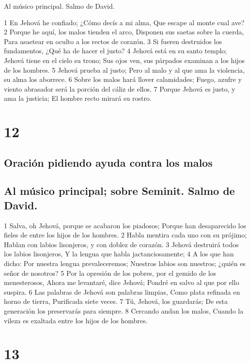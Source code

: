 Al músico principal. Salmo de David.

1 En Jehová he confiado;
¿Cómo decís a mi alma,
Que escape al monte cual ave?
2 Porque he aquí, los malos tienden el arco,
Disponen sus saetas sobre la cuerda,
Para asaetear en oculto a los rectos de corazón.
3 Si fueren destruidos los fundamentos,
¿Qué ha de hacer el justo?
4 Jehová está en su santo templo;
Jehová tiene en el cielo su trono;
Sus ojos ven, sus párpados examinan a los hijos de los hombres.
5 Jehová prueba al justo;
Pero al malo y al que ama la violencia, su alma los aborrece.
6 Sobre los malos hará llover calamidades;
Fuego, azufre y viento abrasador será la porción del cáliz de ellos.
7 Porque Jehová es justo, y ama la justicia;
El hombre recto mirará su rostro.

\chapter{12}

\section*{Oración pidiendo ayuda contra los malos}

\section*{Al músico principal; sobre Seminit. Salmo de David.}

1 Salva, oh Jehová, porque se acabaron los piadosos;
Porque han desaparecido los fieles de entre los hijos de los hombres.
2 Habla mentira cada uno con su prójimo;
Hablan con labios lisonjeros, y con doblez de corazón.
3 Jehová destruirá todos los labios lisonjeros,
Y la lengua que habla jactanciosamente;
4 A los que han dicho: Por nuestra lengua prevaleceremos;
Nuestros labios son nuestros; ¿quién es señor de nosotros?
5 Por la opresión de los pobres, por el gemido de los menesterosos,
Ahora me levantaré, dice Jehová;
Pondré en salvo al que por ello suspira.
6 Las palabras de Jehová son palabras limpias,
Como plata refinada en horno de tierra,
Purificada siete veces.
7 Tú, Jehová, los guardarás;
De esta generación los preservarás para siempre.
8 Cercando andan los malos,
Cuando la vileza es exaltada entre los hijos de los hombres.

\chapter{13}

